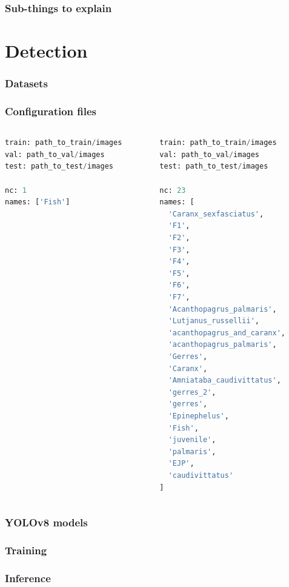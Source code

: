 \documentclass[serif]{beamer}  %
\begin{document}
\begin{frame}
\frametitle{Sub-things to explain}
\end{frame}

\section{Detection}

\begin{frame}
\frametitle{Datasets}
\end{frame}

\begin{frame}[fragile]
\frametitle{Configuration files}
\begin{columns}
\begin{column}{0.45\textwidth}
\begin{lstlisting}[language=python]
train: path_to_train/images
val: path_to_val/images
test: path_to_test/images

nc: 1
names: ['Fish']
\end{lstlisting}
\end{column}

\begin{column}{0.45\textwidth}
\begin{lstlisting}[language=python]
train: path_to_train/images
val: path_to_val/images
test: path_to_test/images

nc: 23
names: [
  'Caranx_sexfasciatus',
  'F1', 
  'F2',
  'F3', 
  'F4',
  'F5',
  'F6',
  'F7',
  'Acanthopagrus_palmaris',
  'Lutjanus_russellii',
  'acanthopagrus_and_caranx',
  'acanthopagrus_palmaris', 
  'Gerres',
  'Caranx',
  'Amniataba_caudivittatus',
  'gerres_2',
  'gerres',
  'Epinephelus',
  'Fish',
  'juvenile',
  'palmaris',
  'EJP',
  'caudivittatus'
]
\end{lstlisting}
\end{column}
\end{columns}
\end{frame}


\begin{frame}
\frametitle{YOLOv8 models}
\end{frame}

\begin{frame}
\frametitle{Training}
\end{frame}

\begin{frame}
\frametitle{Inference}
\end{frame}
\end{document}
